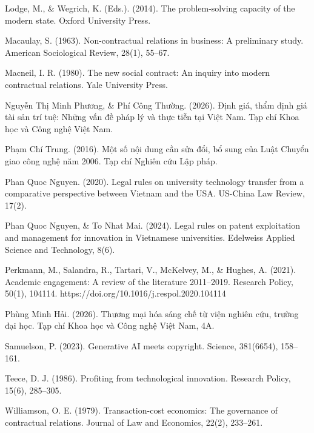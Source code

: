 \documentclass[
]{article}
\begin{document}
Lodge, M., \& Wegrich, K. (Eds.). (2014). The problem-solving capacity
of the modern state. Oxford University Press.

Macaulay, S. (1963). Non-contractual relations in business: A
preliminary study. American Sociological Review, 28(1), 55--67.

Macneil, I. R. (1980). The new social contract: An inquiry into modern
contractual relations. Yale University Press.

Nguyễn Thị Minh Phương, \& Phí Công Thường. (2026). Định giá, thẩm định
giá tài sản trí tuệ: Những vấn đề pháp lý và thực tiễn tại Việt Nam. Tạp
chí Khoa học và Công nghệ Việt Nam.

Phạm Chí Trung. (2016). Một số nội dung cần sửa đổi, bổ sung của Luật
Chuyển giao công nghệ năm 2006. Tạp chí Nghiên cứu Lập pháp.

Phan Quoc Nguyen. (2020). Legal rules on university technology transfer
from a comparative perspective between Vietnam and the USA. US-China Law
Review, 17(2).

Phan Quoc Nguyen, \& To Nhat Mai. (2024). Legal rules on patent
exploitation and management for innovation in Vietnamese universities.
Edelweiss Applied Science and Technology, 8(6).

Perkmann, M., Salandra, R., Tartari, V., McKelvey, M., \& Hughes, A.
(2021). Academic engagement: A review of the literature 2011--2019.
Research Policy, 50(1), 104114.
https://doi.org/10.1016/j.respol.2020.104114

Phùng Minh Hải. (2026). Thương mại hóa sáng chế từ viện nghiên cứu,
trường đại học. Tạp chí Khoa học và Công nghệ Việt Nam, 4A.

Samuelson, P. (2023). Generative AI meets copyright. Science, 381(6654),
158--161.

Teece, D. J. (1986). Profiting from technological innovation. Research
Policy, 15(6), 285--305.

Williamson, O. E. (1979). Transaction-cost economics: The governance of
contractual relations. Journal of Law and Economics, 22(2), 233--261.
\end{document}
